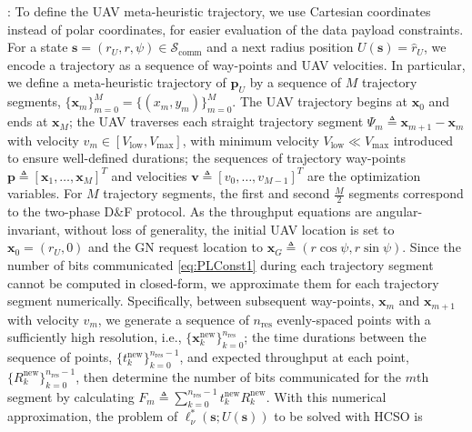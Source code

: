 \documentclass[12pt, draftcls, onecolumn]{IEEEtran}
\theoremstyle{plain}
\theoremstyle{definition}
\theoremstyle{remark}
\begin{document}
: To define the UAV meta-heuristic trajectory, we use Cartesian coordinates instead of polar coordinates, for easier evaluation of the data payload constraints. For a state $\mathbf{s}{=}(r_{U},r,\psi){\in}\mathcal{S}_{\mathrm{comm}}$ and a next radius position $U(\mathbf{s}){=}\hat{r}_{U}$, we encode a trajectory as a sequence of way-points and UAV velocities. In particular, we define a meta-heuristic trajectory of $\mathbf{p}_{U}$ by a sequence of $M$ trajectory segments, $\{\mathbf{x}_{m}\}_{m{=}0}^{M}{=}\{(x_{m},y_{m})\}_{m{=}0}^{M}$. The UAV trajectory begins at $\mathbf{x}_{0}$ and ends at $\mathbf{x}_{M}$; the UAV traverses each straight trajectory segment $\Psi_{m}{\triangleq}\mathbf{x}_{m{+}1}{-}\mathbf{x}_{m}$ with velocity $v_{m}{\in}[V_{\mathrm{low}},V_{\mathrm{max}}]$, with minimum velocity $V_{\mathrm{low}}{\ll}V_{\mathrm{max}}$ introduced to ensure well-defined durations; the sequences of trajectory way-points $\mathbf{p}{\triangleq}[\mathbf{x}_{1},{\dots},\mathbf{x}_{M}]^{T}$ and velocities $\mathbf{v}{\triangleq}[v_{0},{\dots},v_{M{-}1}]^{T}$ are the optimization variables. For $M$ trajectory segments, the first and second $\frac{M}{2}$ segments correspond to the two-phase D\&F protocol. As the throughput equations are angular-invariant, without loss of generality, the initial UAV location is set to $\mathbf{x}_{0}{=}(r_{U},0)$ and the GN request location to $\mathbf{x}_G{\triangleq}(r\cos{\psi},r\sin{\psi})$. Since the number of bits communicated \eqref{eq:PLConst1} during each trajectory segment cannot be computed in closed-form, we approximate them for each trajectory segment numerically. Specifically, between subsequent way-points, $\mathbf{x}_{m}$ and $\mathbf{x}_{m{+}1}$ with velocity $v_{m}$, we generate a sequence of $n_{\mathrm{res}}$ evenly-spaced points with a sufficiently high resolution, i.e., $\{\mathbf{x}_{k}^{\mathrm{new}}\}_{k{=}0}^{n_{\mathrm{res}}}$; the time durations between the sequence of points, $\{t_{k}^{\mathrm{new}}\}_{k{=}0}^{n_{\mathrm{res}}{-}1}$, and expected throughput at each point, $\{R_{k}^{\mathrm{new}}\}_{k{=}0}^{n_{\mathrm{res}}{-}1}$, then determine the number of bits communicated for the $m$th segment by calculating $F_{m}{\triangleq}\sum_{k{=}0}^{n_{\mathrm{res}}{-}1}t_{k}^{\mathrm{new}}R_{k}^{\mathrm{new}}$. With this numerical approximation, the problem of $\ell_{\nu}^{*}(\mathbf{s};U(\mathbf{s}))$ to be solved with HCSO is
\end{document}
